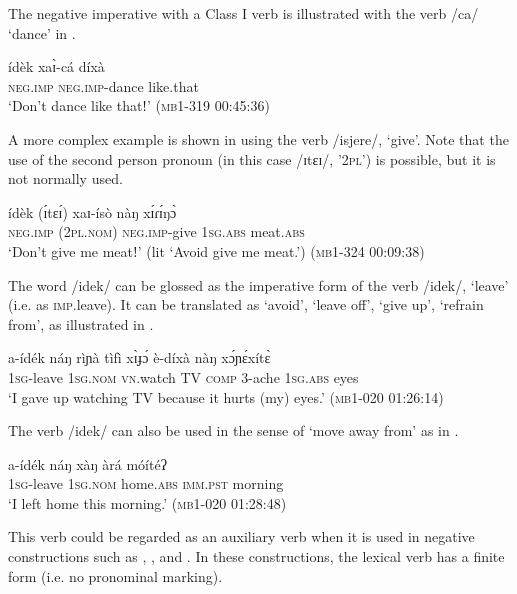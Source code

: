 \documentclass[output=paper,colorlinks,citecolor=brown,draftmode]{langscibook}
\begin{document}
The negative imperative with a Class I verb is illustrated with the verb /ca/ ‘dance' in .

\ea\label{ex:lop:17}
        \gll ídèk xaɪ̀-cá díxà   \\ 
             \textsc{neg.imp} \textsc{neg.imp-}dance like.that \\
        \glt `Don't dance like thatǃ'    (\textsc{mb1-319} \textsc{00}:45:36)
\z

A more complex example is shown in  using the verb /isjere/, ‘give'. Note that the use of the second person pronoun (in this case /ɪtɛɪ/, \textsc{{}'2pl'}) is possible, but it is not normally used.

\ea\label{ex:lop:18}
        \gll ídèk (ɪ́tɛɪ́) xaɪ-ísò nàŋ xɪ́ɾɪ́ŋɔ̀ \\ 
             \textsc{neg.imp} (2\textsc{pl.nom}) \textsc{neg.imp}{}-give 1\textsc{sg.abs} meat.\textsc{abs} \\
        \glt `Don't give me meatǃ' (lit ‘Avoid give me meat.')  (\textsc{mb1-324} \textsc{00:}09:38)
\z

The word /idek/ can be glossed as the imperative form of the verb /idek/, ‘leave’ (i.e. as \textsc{imp}.leave).  It can be translated as ‘avoid', ‘leave off', ‘give up', ‘refrain from', as illustrated in .

\ea\label{ex:lop:19}
        \gll a-ídék náŋ rìɲà tìfì xɪ̀ɟɔ́ è-díxà nàŋ xɔ́ɲɛ́xítɛ̀ \\ 
             \textsc{1sg}{}-leave 1\textsc{sg.nom} \textsc{vn}.watch TV \textsc{comp} 3-ache 1\textsc{sg.abs} eyes \\
        \glt ‘I gave up watching TV because it hurts (my) eyes.’       (\textsc{mb1-020} 01:26:14)
\z

The verb /idek/ can also be used in the sense of ‘move away from’ as in .

\ea\label{ex:lop:20}
        \gll a-ídék náŋ xàŋ àrá móítéʔ \\ 
             1\textsc{sg}{}-leave 1\textsc{sg.nom} home.\textsc{abs} \textsc{imm.pst} morning \\
        \glt ‘I left home this morning.’       (\textsc{mb1-020} 01:28:48)
\z

This verb could be regarded as an auxiliary verb when it is used in negative constructions such as , , and . In these constructions, the lexical verb has a finite form (i.e. no pronominal marking).
\end{document}
